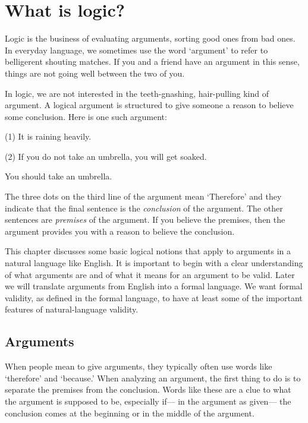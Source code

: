 \chapter{What is logic?}
\label{ch.intro}

Logic is the business of evaluating arguments, sorting good ones from bad ones. In everyday language, we sometimes use the word `argument' to refer to belligerent shouting matches. If you and a friend have an argument in this sense, things are not going well between the two of you.

In logic, we are not interested in the teeth-gnashing, hair-pulling kind of argument. A logical argument is structured to give someone a reason to believe some conclusion. Here is one such argument:

\label{argRaining}
\begin{earg}
\item[(1)] It is raining heavily.
\item[(2)] If you do not take an umbrella, you will get soaked.
\item[\therefore] You should take an umbrella.
\end{earg}

The three dots on the third line of the argument mean `Therefore' and they indicate that the final sentence is the \emph{conclusion} of the argument. The other sentences are \emph{premises} of the argument. If you believe the premises, then the argument provides you with a reason to believe the conclusion.

This chapter discusses some basic logical notions that apply to arguments in a natural language like English. It is important to begin with a clear understanding of what arguments are and of what it means for an argument to be valid. Later we will translate arguments from English into a formal language. We want formal validity, as defined in the formal language, to have at least some of the important features of natural-language validity.

\section{Arguments}
When people mean to give arguments, they typically often use words like `therefore' and `because.' When analyzing an argument, the first thing to do is to separate the premises from the conclusion. Words like these are a clue to what the argument is supposed to be, especially if--- in the argument as given--- the conclusion comes at the beginning or in the middle of the argument.

